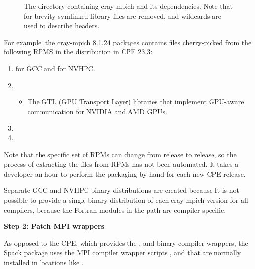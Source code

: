 \begin{figure}[htp!]
    
    \caption{The directory containing cray-mpich and its dependencies. Note that for brevity symlinked library files are removed, and wildcards are used to describe headers.}
    \label{fig:mpich-tree}
\end{figure}

For example, the cray-mpich 8.1.24 packages contains files cherry-picked from the following RPMS in the distribution in CPE 23.3:
\begin{enumerate}
    \item {} for GCC  and  for NVHPC.
    \item {}
    \begin{itemize}
        \item The GTL (GPU Transport Layer) libraries that implement GPU-aware communication for NVIDIA and AMD GPUs.
    \end{itemize}
    \item {}
    \item {}
\end{enumerate}
Note that the specific set of RPMs can change from release to release, so the process of extracting the files from RPMs has not been automated.
It takes a developer an hour to perform the packaging by hand for each new CPE release.

Separate GCC and NVHPC binary distributions are created because It is not possible to provide a single binary distribution of each cray-mpich version for all compilers, because the Fortran modules in the  path are compiler specific.

\noindent\textbf{Step 2: Patch MPI wrappers}

As opposed to the CPE, which provides the ,  and  binary compiler wrappers, the Spack package uses the MPI compiler wrapper scripts ,  and  that are normally installed in locations like .

